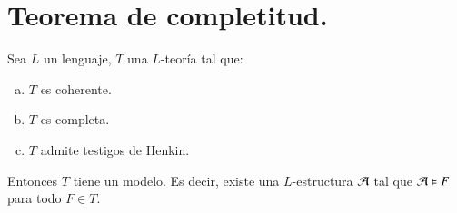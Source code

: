 
\chapter{Teorema de completitud.}

\begin{thm}\label{thm:modelos}
    Sea $L$ un lenguaje, $T$ una $L$-teoría tal que:
    \begin{enumerate}[(a)]
        \item $T$ es coherente.
        \item $T$ es completa.
        \item $T$ admite testigos de Henkin.
    \end{enumerate}
    Entonces $T$ tiene un modelo. Es decir, existe una $L$-estructura $\mathcal{A}$ tal que $\mathcal{A} \vDash F$ para todo $F \in T$.
\end{thm}

